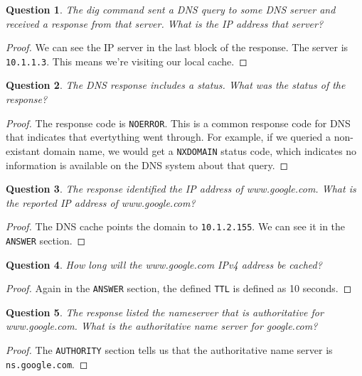 \documentclass[a4paper,11pt,hidelinks]{article}
\newtheorem{theorem}{Question}[subsection]
\begin{document}
\begin{theorem}
    The dig command sent a DNS query to some DNS server and received a response from that server. What is the IP address that server?
\end{theorem}

\begin{proof}
    We can see the IP server in the last block of the response. The server is \verb=10.1.1.3=. This means we're visiting our local cache.
\end{proof}

\begin{theorem}
    The DNS response includes a status. What was the status of the response?
\end{theorem}

\begin{proof}
    The response code is \verb=NOERROR=. This is a common response code for DNS that indicates that evertything went through. For example, if we queried a non-existant domain name, we would get a \verb=NXDOMAIN= status code, which indicates no information is available on the DNS system about that query.
\end{proof}

\begin{theorem}
    The response identified the IP address of www.google.com. What is the reported IP address of www.google.com?
\end{theorem}

\begin{proof}
    The DNS cache points the domain to \verb=10.1.2.155=. We can see it in the \verb=ANSWER= section.
\end{proof}

\begin{theorem}
    How long will the www.google.com IPv4 address be cached?
\end{theorem}

\begin{proof}
    Again in the \verb=ANSWER= section, the defined \verb=TTL= is defined as 10 seconds.
\end{proof}

\begin{theorem}
    The response listed the nameserver that is authoritative for www.google.com. What is the authoritative name server for google.com?
\end{theorem}

\begin{proof}
    The \verb=AUTHORITY= section tells us that the authoritative name server is \verb=ns.google.com=.
\end{proof}
\end{document}
